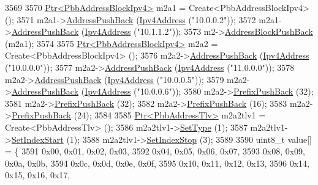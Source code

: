 \begin{DoxyCode}
3569 
3570     \hyperlink{classns3_1_1Ptr}{Ptr<PbbAddressBlockIpv4>} m2a1 = Create<PbbAddressBlockIpv4> ();
3571     m2a1->\hyperlink{classns3_1_1PbbAddressBlock_a7be545a53d69bd426dbebcf752ed8371}{AddressPushBack} (\hyperlink{classns3_1_1Ipv4Address}{Ipv4Address} (\textcolor{stringliteral}{"10.0.0.2"}));
3572     m2a1->\hyperlink{classns3_1_1PbbAddressBlock_a7be545a53d69bd426dbebcf752ed8371}{AddressPushBack} (\hyperlink{classns3_1_1Ipv4Address}{Ipv4Address} (\textcolor{stringliteral}{"10.1.1.2"}));
3573     m2->\hyperlink{classns3_1_1PbbMessage_a5f623bad2fb1adde7da885e1c92d5311}{AddressBlockPushBack} (m2a1);
3574 
3575     \hyperlink{classns3_1_1Ptr}{Ptr<PbbAddressBlockIpv4>} m2a2 = Create<PbbAddressBlockIpv4> ();
3576     m2a2->\hyperlink{classns3_1_1PbbAddressBlock_a7be545a53d69bd426dbebcf752ed8371}{AddressPushBack} (\hyperlink{classns3_1_1Ipv4Address}{Ipv4Address} (\textcolor{stringliteral}{"10.0.0.0"}));
3577     m2a2->\hyperlink{classns3_1_1PbbAddressBlock_a7be545a53d69bd426dbebcf752ed8371}{AddressPushBack} (\hyperlink{classns3_1_1Ipv4Address}{Ipv4Address} (\textcolor{stringliteral}{"11.0.0.0"}));
3578     m2a2->\hyperlink{classns3_1_1PbbAddressBlock_a7be545a53d69bd426dbebcf752ed8371}{AddressPushBack} (\hyperlink{classns3_1_1Ipv4Address}{Ipv4Address} (\textcolor{stringliteral}{"10.0.0.5"}));
3579     m2a2->\hyperlink{classns3_1_1PbbAddressBlock_a7be545a53d69bd426dbebcf752ed8371}{AddressPushBack} (\hyperlink{classns3_1_1Ipv4Address}{Ipv4Address} (\textcolor{stringliteral}{"10.0.0.6"}));
3580     m2a2->\hyperlink{classns3_1_1PbbAddressBlock_a8e6f539ccffd043a2890396d882d0a42}{PrefixPushBack} (32);
3581     m2a2->\hyperlink{classns3_1_1PbbAddressBlock_a8e6f539ccffd043a2890396d882d0a42}{PrefixPushBack} (32);
3582     m2a2->\hyperlink{classns3_1_1PbbAddressBlock_a8e6f539ccffd043a2890396d882d0a42}{PrefixPushBack} (16);
3583     m2a2->\hyperlink{classns3_1_1PbbAddressBlock_a8e6f539ccffd043a2890396d882d0a42}{PrefixPushBack} (24);
3584 
3585     \hyperlink{classns3_1_1Ptr}{Ptr<PbbAddressTlv>} m2a2tlv1 = Create<PbbAddressTlv> ();
3586     m2a2tlv1->\hyperlink{classns3_1_1PbbTlv_a90a0452018ed364ac37c3ad116dd718b}{SetType} (1);
3587     m2a2tlv1->\hyperlink{classns3_1_1PbbAddressTlv_a82d685ae4e4e2f6d2532cb212f5b2797}{SetIndexStart} (1);
3588     m2a2tlv1->\hyperlink{classns3_1_1PbbAddressTlv_af37ebd0d99b8b894fee7cca449d7adb9}{SetIndexStop} (3);
3589 
3590     uint8\_t value[] = \{
3591       0x00, 0x01, 0x02, 0x03,
3592       0x04, 0x05, 0x06, 0x07,
3593       0x08, 0x09, 0x0a, 0x0b,
3594       0x0c, 0x0d, 0x0e, 0x0f,
3595       0x10, 0x11, 0x12, 0x13,
3596       0x14, 0x15, 0x16, 0x17,

\end{DoxyCode}

